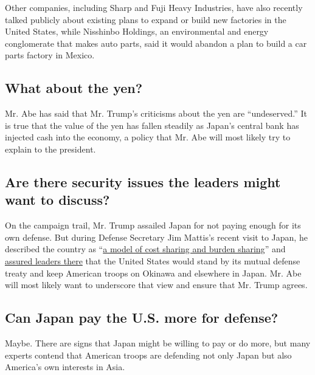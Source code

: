 Other companies, including Sharp and Fuji Heavy Industries, have also
recently talked publicly about existing plans to expand or build new
factories in the United States, while Nisshinbo Holdings, an
environmental and energy conglomerate that makes auto parts, said it
would abandon a plan to build a car parts factory in Mexico.

\hypertarget{what-about-the-yen}{%
\subsection{What about the yen?}\label{what-about-the-yen}}

Mr. Abe has said that Mr. Trump's criticisms about the yen are
``undeserved.'' It is true that the value of the yen has fallen steadily
as Japan's central bank has injected cash into the economy, a policy
that Mr. Abe will most likely try to explain to the president.

\hypertarget{are-there-security-issues-the-leaders-might-want-to-discuss}{%
\subsection{Are there security issues the leaders might want to
discuss?}\label{are-there-security-issues-the-leaders-might-want-to-discuss}}

On the campaign trail, Mr. Trump assailed Japan for not paying enough
for its own defense. But during Defense Secretary Jim Mattis's recent
visit to Japan, he described the country as
``\href{https://www.nytimes.com/2017/02/04/world/asia/jim-mattis-defense-iran-persian-gulf.html}{a
model of cost sharing and burden sharing}'' and
\href{https://www.nytimes.com/2017/02/03/world/asia/us-japan-mattis-abe-defense.html}{assured
leaders there} that the United States would stand by its mutual defense
treaty and keep American troops on Okinawa and elsewhere in Japan. Mr.
Abe will most likely want to underscore that view and ensure that Mr.
Trump agrees.

\hypertarget{can-japan-pay-the-us-more-for-defense}{%
\subsection{Can Japan pay the U.S. more for
defense?}\label{can-japan-pay-the-us-more-for-defense}}

Maybe. There are signs that Japan might be willing to pay or do more,
but many experts contend that American troops are defending not only
Japan but also America's own interests in Asia.

